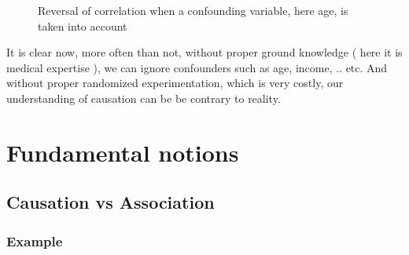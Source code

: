 \documentclass{article}
\begin{document}
\begin{figure}[!tbp]
  \centering
  \hfill
  \caption{Reversal of correlation when a confounding variable, here age, is taken into account}
\label{fig:simpsonexample}
\end{figure}





It is clear now, more often than not, without proper ground knowledge ( here it is medical expertise ), we can ignore confounders such as age, income, .. etc. And without proper randomized experimentation, which is very costly, our understanding of causation can be be contrary to reality.


\newpage


\section{Fundamental notions}




\subsection{Causation vs Association}

	\subsubsection{Example}
\end{document}
